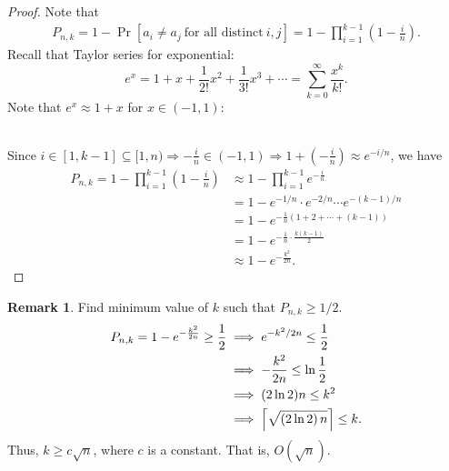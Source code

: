 \documentclass[12pt,openany]{book}
\DeclarePairedDelimiter{\ceil}{\lceil}{\rceil}
\DeclarePairedDelimiter{\floor}{\lfloor}{\rfloor}
\theoremstyle{definition}
\newtheorem{remark}{Remark}[chapter]
\newcommand{\of}[1]{\left( #1 \right)}
\begin{document}
	\begin{proof}
		Note that \begin{align*}
			P_{n,k}=1-\Pr[a_i\neq a_j\ \text{for all distinct}\ i,j]=1-\prod_{i=1}^{k-1}\of{1-\frac{i}{n}}.
		\end{align*} Recall that Taylor series for exponential: \[
		e^x=1+x+\frac{1}{2!}x^2+\frac{1}{3!}x^3+\cdots=\sum_{k=0}^{\infty}\frac{x^k}{k!}.
		\] Note that $e^x\approx1+x$ for $x\in(-1,1)$:
		\begin{figure}[ht!]
			\centering
		\end{figure}\\
		Since $i\in[1,k-1]\subseteq[1,n)\Rightarrow-\frac{i}{n}\in\of{-1,1}\Rightarrow 1+\of{-\frac{i}{n}}\approx e^{-i/n}$, we have \begin{align*}
			P_{n,k}=
			1-\prod_{i=1}^{k-1}\of{1-\frac{i}{n}}
			&\approx 1-\prod_{i=1}^{k-1}e^{-\frac{i}{n}}\\
			&=1-e^{-1/n}\cdot e^{-2/n}\cdots e^{-(k-1)/n}\\
			&=1-e^{-\frac{1}{n}\of{1+2+\cdots+(k-1)}}\\
			&=1-e^{-\frac{1}{n}\cdot\frac{k\of{k-1}}{2}}\\
			&\approx 1-e^{-\frac{k^2}{2n}}.
		\end{align*}
	\end{proof}
	
	\begin{remark}
		Find minimum value of $k$ such that $P_{n,k}\geq 1/2$. \begin{align*}
			P_{n,k}=1-e^{-\frac{k^2}{2n}}\geq\frac{1}{2}&\implies e^{-k^2/2n}\leq\frac{1}{2}\\
			&\implies-\frac{k^2}{2n}\leq\ln\frac{1}{2}\\
			&\implies (2\ln2)n\leq k^2\\
			&\implies \ceil*{\sqrt{\of{2\ln 2}n}}\leq k.
		\end{align*} 
		Thus, $k\geq c\sqrt{n}$, where $c$ is a constant. That is, $O(\sqrt{n})$.
	\end{remark}
	
	\iffalse
	\begin{remark}
		Find the upper bound of $P_{n,k}$. \begin{align*}
			P_{n,k}
			&=\Pr\left[(a_1=a_2)\lor\cdots\lor(a_1=a_k)\lor(a_2=a_3)\lor\cdots\lor(a_{k-1}=a_k)\right]\\
			&\leq\sum_{1\leq i< j\leq k}\Pr\left[a_i=a_j\right]\\
			&=\binom{k}{2}\frac{1}{n}\\
			&\leq\frac{k^2}{2n}.
		\end{align*} Thus, the upper bound of $P_{n,k}$ is less than 1/2 when $k=\floor*{\sqrt{n}}$.
	\end{remark}
	\fi
	
\end{document}
